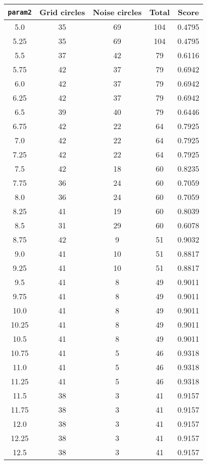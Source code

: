 \documentclass[letterpaper, 12pt]{article}
\begin{document}
\begin{longtable}{|c|c|c|c|c|}
\hline
\textbf{\texttt{param2}} & \textbf{Grid circles} & \textbf{Noise circles} & \textbf{Total} & \textbf{Score} \\
\hline
5.0 & 35 & 69 & 104 & 0.4795 \\
\hline
5.25 & 35 & 69 & 104 & 0.4795 \\
\hline
5.5 & 37 & 42 & 79 & 0.6116 \\
\hline
5.75 & 42 & 37 & 79 & 0.6942 \\
\hline
6.0 & 42 & 37 & 79 & 0.6942 \\
\hline
6.25 & 42 & 37 & 79 & 0.6942 \\
\hline
6.5 & 39 & 40 & 79 & 0.6446 \\
\hline
6.75 & 42 & 22 & 64 & 0.7925 \\
\hline
7.0 & 42 & 22 & 64 & 0.7925 \\
\hline
7.25 & 42 & 22 & 64 & 0.7925 \\
\hline
7.5 & 42 & 18 & 60 & 0.8235 \\
\hline
7.75 & 36 & 24 & 60 & 0.7059 \\
\hline
8.0 & 36 & 24 & 60 & 0.7059 \\
\hline
8.25 & 41 & 19 & 60 & 0.8039 \\
\hline
8.5 & 31 & 29 & 60 & 0.6078 \\
\hline
8.75 & 42 & 9 & 51 & 0.9032 \\
\hline
9.0 & 41 & 10 & 51 & 0.8817 \\
\hline
9.25 & 41 & 10 & 51 & 0.8817 \\
\hline
9.5 & 41 & 8 & 49 & 0.9011 \\
\hline
9.75 & 41 & 8 & 49 & 0.9011 \\
\hline
10.0 & 41 & 8 & 49 & 0.9011 \\
\hline
10.25 & 41 & 8 & 49 & 0.9011 \\
\hline
10.5 & 41 & 8 & 49 & 0.9011 \\
\hline
10.75 & 41 & 5 & 46 & 0.9318 \\
\hline
11.0 & 41 & 5 & 46 & 0.9318 \\
\hline
11.25 & 41 & 5 & 46 & 0.9318 \\
\hline
11.5 & 38 & 3 & 41 & 0.9157 \\
\hline
11.75 & 38 & 3 & 41 & 0.9157 \\
\hline
12.0 & 38 & 3 & 41 & 0.9157 \\
\hline
12.25 & 38 & 3 & 41 & 0.9157 \\
\hline
12.5 & 38 & 3 & 41 & 0.9157 \\

\end{longtable}
\end{document}
